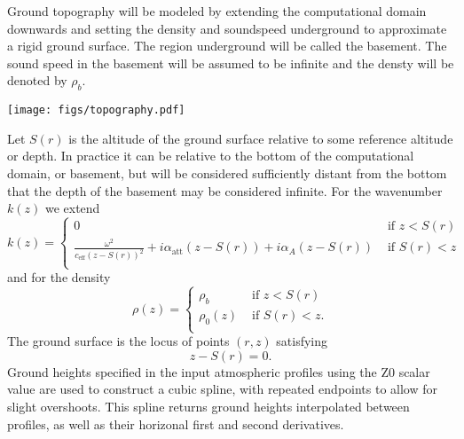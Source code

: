 Ground topography will be modeled by extending the computational domain downwards and setting the density and soundspeed underground to approximate a rigid ground surface. The region underground will be called the basement. The sound speed in the basement will be assumed to be infinite and the densty will be denoted by $\rho_b$. 
\begin{figure*}[h]
  \centering
  \texttt{[image: figs/topography.pdf]}
\end{figure*}
Let $S(r)$ is the altitude of the ground surface relative to some reference altitude or depth. In practice it can be relative to the bottom of the computational domain, or basement, but will be considered sufficiently distant from the bottom that the depth of the basement may be considered infinite. For the wavenumber $k(z)$ we extend
\begin{equation}
k(z)=\begin{cases}
0 & \text{   if } z<S(r)\\
\frac{\omega^2}{c_{\text{eff}}(z-S(r))^2}+i\alpha_{\text{att}}(z-S(r))+i\alpha_A(z-S(r)) & \text{   if } S(r)<z\\
\end{cases}
\label{eq:k_def_w_basement}\end{equation}
and for the density
\[
\rho(z) =\begin{cases}
\rho_b & \text{   if } z<S(r)\\
\rho_0(z) & \text{   if } S(r)<z.\\
\end{cases}
\]
The ground surface is the locus of points $(r,z)$ satisfying 
\[
z-S(r)=0.
\]
Ground heights specified in the input atmospheric profiles using the Z0 scalar value are used to construct a cubic spline, with repeated endpoints to allow for slight overshoots. This spline returns ground heights interpolated between profiles, as well as their horizonal first and second derivatives.


